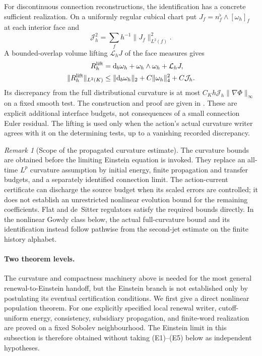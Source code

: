 \documentclass[11pt]{article}
\theoremstyle{definition}
\theoremstyle{remark}
\newtheorem{remark}[remark]{Remark}
\newcommand{\dd}{\mathrm d}
\begin{document}
For discontinuous connection reconstructions, the identification has a concrete
sufficient realization.  On a uniformly regular cubical chart put
$J_f=n_f^\flat\wedge[\omega_h]_f$ at each interior face and
\begin{equation}
 \mathcal J_h^2=\sum_fh^{-1}\|J_f\|_{L^2(f)}^2.
 \label{eq:main-interface-budget}
\end{equation}
A bounded-overlap volume lifting $\mathcal L_hJ$ of the face measures gives
\begin{equation}
 \begin{aligned}
 R_h^{\rm lift}
   &=\dd_b\omega_h+\omega_h\wedge\omega_h+\mathcal L_hJ,\\
 \|R_h^{\rm lift}\|_{L^2(K)}
   &\le\|\dd_b\omega_h\|_2+C\|\omega_h\|_4^2+C\mathcal J_h.
 \end{aligned}
 \label{eq:main-lifted-curvature}
\end{equation}
Its discrepancy from the full distributional curvature is at most
$C_Kh\mathcal J_h\|\nabla\Phi\|_\infty$ on a fixed smooth test.  The
construction and proof are given in .
These are explicit additional interface budgets, not consequences of a small
connection Euler residual.  The lifting is used only when the action's actual
curvature writer agrees with it on the determining tests, up to a vanishing
recorded discrepancy.

\begin{remark}[Scope of the propagated curvature estimate]
\label{rem:main-curvature-not-circular}
The curvature bounds are obtained before the limiting Einstein equation is
invoked.  They replace an all-time $L^p$ curvature assumption by initial
energy, finite propagation and transfer budgets, and a separately identified
connection limit.  The action-current certificate can discharge the source
budget when its scaled errors are controlled; it does not establish an
unrestricted nonlinear evolution bound for the remaining coefficients.
Flat and de~Sitter regulators satisfy the required bounds directly.  In the
nonlinear Gowdy class below, the actual full-curvature bound and its
identification instead follow pathwise from the second-jet estimate on the
finite history alphabet.
\end{remark}


\paragraph{Two theorem levels.}

The curvature and compactness machinery above is needed for the most general
renewal-to-Einstein handoff, but the Einstein branch is not established only
by postulating its eventual certification conditions.  We first give a
direct nonlinear population theorem.  For one explicitly specified local
renewal writer, cutoff-uniform energy, consistency, subsidiary propagation,
and finite-word realization are proved on a fixed Sobolev neighbourhood.
The Einstein limit in this subsection is therefore obtained without taking
\textup{(E1)--(E5)} below as independent hypotheses.
\end{document}
